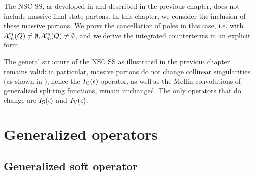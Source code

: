 
The NSC SS, as developed in \cite{rontsch-2023, rontsch-2503, rontsch-2509} and described in the previous chapter, does not include massive final-state partons. In this chapter, we consider the inclusion of these massive partons. We prove the cancellation of poles in this case, i.e. with $ \mathcal{X}^{n}_{m}(Q) \neq \emptyset , \mathcal{X}^{n}_{m}(\bar{Q}) \neq \emptyset $, and we derive the integrated counterterms in an explicit form.

The general structure of the NSC SS as illustrated in the previous chapter remains valid: in particular, massive partons do not change collinear singularities (as shown in ), hence the $ I_\text{C}(\epsilon) $ operator, as well as the Mellin convolutions of generalized splitting functions, remain unchanged. The only operators that do change are $ I_\text{S}(\epsilon) $ and $ I_\text{V}(\epsilon) $.

\section{Generalized operators}

\subsection{Generalized soft operator}
\label{ssec:soft-gen}

